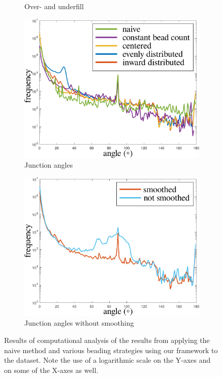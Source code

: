\begin{figure}
\begin{subfigure}{\figwidth}
\caption{Over- and underfill}
\label{over_underfill}
\end{subfigure}
\begin{subfigure}{\figwidth}\centering
\includegraphics[height=\figheight]{sources/validation/smoothness.pdf}
\caption{Junction angles}
\label{smoothness}
\end{subfigure}
\begin{subfigure}{\figwidth}\centering
\includegraphics[height=\figheight]{sources/validation/smoothnessNoTransition.pdf}
\caption{Junction angles without smoothing}
\label{smoothnessNoTransition}
\end{subfigure}


\caption{
Results of computational analysis of the results from applying the naive method and various beading strategies using our framework to the dataset.
Note the use of a logarithmic scale on the Y-axes and on some of the X-axes as well.
}
\end{figure}
